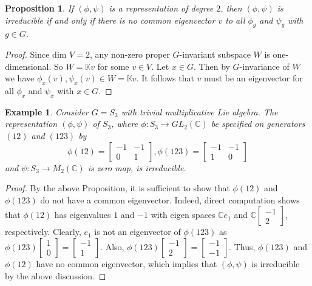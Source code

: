 \documentclass[10 pt,oneside,reqno,a4paper]{amsart}
\newtheorem{proposition}[theorem]{Proposition}
\newtheorem{example}[theorem]{Example}
\numberwithin{equation}{section}
\newcommand{\field}[1]{\mathbb{#1}}          \newcommand{\Q}{\field{Q}}
\newcommand{\C}{\field{C}}                   \newcommand{\A}{\field{A}}
\begin{document}
\begin{proposition}
    If $(\phi,\psi)$ is a representation of degree $2$, then $(\phi,\psi)$ is irreducible if and only if there is no common eigenvector $v$ to all $\phi_g$ and $\psi_g$ with $g\in G$.
\end{proposition}
    \begin{proof}
        Since dim ${V}=2$, any non-zero proper $G$-invariant subspace $W$ is one-dimensional. So $W=\mathbb{\mathbb{K}}v$ for some $v\in V$. Let $x\in G$. Then by $G$-invariance of $W$ we have $\phi_x(v),\psi_x(v) \in W=\mathbb{K}v$. It follows that $v$ must be an eigenvector for all $\phi_x$ and $\psi_x$ with $x\in G.$
    \end{proof}
\begin{example}
    
Consider $G=S_3$ with trivial multiplicative Lie algebra.
    The representation $(\phi,\psi)$ of $S_3$, where $\phi: S_3 \rightarrow GL_2(\C)$ be specified on generators $(12)$ and $(123)$ by \[\phi(12)=
\begin{bmatrix}
-1 & -1 \\
0 & 1
\end{bmatrix}
 , \phi(123)=
\begin{bmatrix}
-1 & -1 \\
1 & 0
\end{bmatrix}
\] and $\psi:S_3 \to M_2(\C)$ is zero map, is irreducible.
\end{example}
\begin{proof}
By the above Proposition, it is sufficient to show that $\phi(12)$ and $\phi(123)$ do not have a common eigenvector. Indeed, direct computation shows that $\phi(12)$ has eigenvalues $1$ and $-1$ with eigen spaces $\mathbb{C}e_1$ and $\mathbb{C}\begin{bmatrix}
        -1 \\ 2
    \end{bmatrix}$, respectively. Clearly, $e_1$ is not an eigenvector of $\phi(123)$ as
    $\phi(123)\begin{bmatrix}
        1 \\ 0
    \end{bmatrix}=\begin{bmatrix}
        -1 \\ 1
    \end{bmatrix}$. Also, $\phi(123)\begin{bmatrix}
        -1 \\ 2
    \end{bmatrix}=\begin{bmatrix}
        -1 \\ -1
    \end{bmatrix}$. Thus, $\phi(123)$ and $\phi(12)$ have no common eigenvector, which implies that $(\phi,\psi)$ is irreducible by the above discussion.
    \end{proof}
\end{document}
